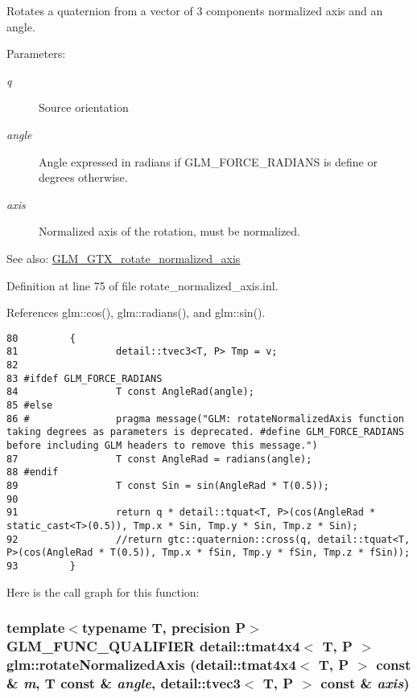 Rotates a quaternion from a vector of 3 components normalized axis and an angle.

\begin{Desc}
\item[Parameters:]
\begin{description}
\item[{\em q}]Source orientation \item[{\em angle}]Angle expressed in radians if GLM\_\-FORCE\_\-RADIANS is define or degrees otherwise. \item[{\em axis}]Normalized axis of the rotation, must be normalized.\end{description}
\end{Desc}
\begin{Desc}
\item[See also:]\hyperlink{group__gtx__rotate__normalized__axis}{GLM\_\-GTX\_\-rotate\_\-normalized\_\-axis} \end{Desc}


Definition at line 75 of file rotate\_\-normalized\_\-axis.inl.

References glm::cos(), glm::radians(), and glm::sin().

\begin{Code}\begin{verbatim}80         {
81                 detail::tvec3<T, P> Tmp = v;
82 
83 #ifdef GLM_FORCE_RADIANS
84                 T const AngleRad(angle);
85 #else
86 #               pragma message("GLM: rotateNormalizedAxis function taking degrees as parameters is deprecated. #define GLM_FORCE_RADIANS before including GLM headers to remove this message.")
87                 T const AngleRad = radians(angle);
88 #endif
89                 T const Sin = sin(AngleRad * T(0.5));
90 
91                 return q * detail::tquat<T, P>(cos(AngleRad * static_cast<T>(0.5)), Tmp.x * Sin, Tmp.y * Sin, Tmp.z * Sin);
92                 //return gtc::quaternion::cross(q, detail::tquat<T, P>(cos(AngleRad * T(0.5)), Tmp.x * fSin, Tmp.y * fSin, Tmp.z * fSin));
93         }
\end{verbatim}
\end{Code}




Here is the call graph for this function:\hypertarget{group__gtx__rotate__normalized__axis_g9fc93bb16dd6719fc660a506cb833fb0}{
\subsubsection[rotateNormalizedAxis]{\setlength{\rightskip}{0pt plus 5cm}template$<$typename T, precision P$>$ GLM\_\-FUNC\_\-QUALIFIER detail::tmat4x4$<$ T, P $>$ glm::rotateNormalizedAxis (detail::tmat4x4$<$ T, P $>$ const \& {\em m}, \/  T const \& {\em angle}, \/  detail::tvec3$<$ T, P $>$ const \& {\em axis})}}
\label{group__gtx__rotate__normalized__axis_g9fc93bb16dd6719fc660a506cb833fb0}


